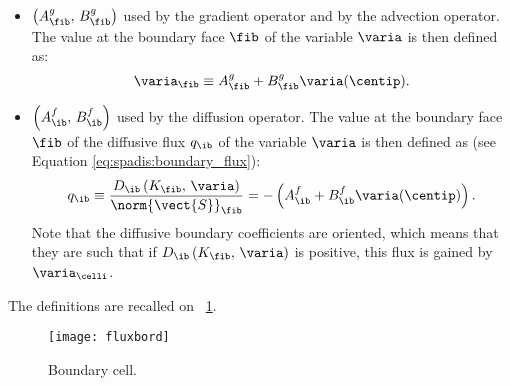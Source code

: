 \begin{itemize}
\item $\left( A^g_\fib , \, B^g_\fib\right)$ used by the gradient operator and by the advection operator.
The value at the boundary face $\fib$ of the variable $\varia$ is
then defined as:
\begin{equation}\label{eq:bndcnd:coef_g_def}
\varia_\fib \equiv A^g_\fib + B^g_\fib \varia(\centip).
\end{equation}
%
\item $\left( A^f_\ib , \, B^f_\ib\right)$ used by the diffusion operator.
The value at the boundary face $\fib$ of the diffusive flux $q_\ib$ of the variable $\varia$
is then defined as (see Equation \eqref{eq:spadis:boundary_flux}):
\begin{equation}\label{eq:bndcnd:coef_f_def}
q_\ib \equiv \dfrac{D_\ib \left( K_\fib , \, \varia \right)}{\norm{\vect{S}}_\fib} = -\left(A^f_\ib + B^f_\ib  \varia(\centip)\right).
\end{equation}
Note that the diffusive boundary coefficients are oriented, which means that they are such that if $D_\ib \left( K_\fib , \, \varia \right) $ is positive,
this flux is gained by $\varia_\celli$.
\end{itemize}
The definitions are recalled on \figurename~\ref{fig:bndcnd:boundary_flux}.

\begin{figure}[!htpb]
\centering
\texttt{[image: fluxbord]}
\caption{Boundary cell.\label{fig:bndcnd:boundary_flux}}
\end{figure}

